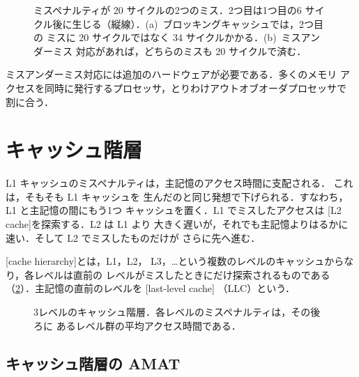 \documentclass[../main.tex]{subfiles}
\begin{document}
\begin{figure}[htbp]
  \centering
  
  \caption{ミスペナルティが 20 サイクルの2つのミス．2つ目は1つ目の6
    サイクル後に生じる（縦線）．(a)~ブロッキングキャッシュでは，2つ目の
    ミスに 20 サイクルではなく 34 サイクルかかる．(b)~ミスアンダーミス
    対応があれば，どちらのミスも 20 サイクルで済む．}
  \label{fig:l14-overlap}
\end{figure}

ミスアンダーミス対応には追加のハードウェアが必要である．多くのメモリ
アクセスを同時に発行するプロセッサ，とりわけアウトオブオーダプロセッサで
割に合う．

\section{キャッシュ階層}
\label{sec:l14-hierarchy}

L1 キャッシュのミスペナルティは，主記憶のアクセス時間に支配される．
これは，そもそも L1 キャッシュを
生んだのと同じ発想で下げられる．すなわち，L1 と主記憶の間にもう1つ
キャッシュを置く．L1 でミスしたアクセスは
[L2 cache]を探索する．L2 は L1 より
大きく遅いが，それでも主記憶よりはるかに速い．そして L2 でミスしたものだけが
さらに先へ進む．

\begin{definition}[キャッシュ階層]
  [cache hierarchy]とは，L1，L2，
  L3，\ldots という複数のレベルのキャッシュからなり，各レベルは直前の
  レベルがミスしたときにだけ探索されるものである
  （\cref{fig:l14-hierarchy}）．主記憶の直前のレベルを
  [last-level cache]%
  （LLC）という．
\end{definition}

\begin{figure}[htbp]
  \centering
  
  \caption{3レベルのキャッシュ階層．各レベルのミスペナルティは，その後ろに
    あるレベル群の平均アクセス時間である．}
  \label{fig:l14-hierarchy}
\end{figure}

\subsection{キャッシュ階層の AMAT}
\end{document}
